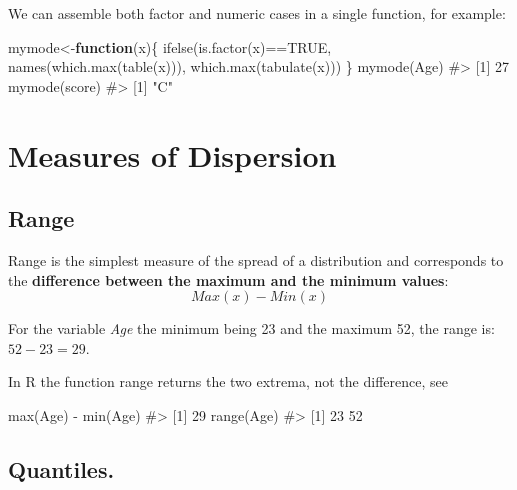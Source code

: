 \documentclass[
  letterpaper,
  DIV=11,
  numbers=noendperiod]{scrreprt}
\newenvironment{Shaded}{\begin{snugshade}}{\end{snugshade}}
\newcommand{\CommentTok}[1]{\textcolor[rgb]{0.37,0.37,0.37}{#1}}
\newcommand{\ConstantTok}[1]{\textcolor[rgb]{0.56,0.35,0.01}{#1}}
\newcommand{\ControlFlowTok}[1]{\textcolor[rgb]{0.00,0.23,0.31}{\textbf{#1}}}
\newcommand{\FunctionTok}[1]{\textcolor[rgb]{0.28,0.35,0.67}{#1}}
\newcommand{\NormalTok}[1]{\textcolor[rgb]{0.00,0.23,0.31}{#1}}
\newcommand{\OtherTok}[1]{\textcolor[rgb]{0.00,0.23,0.31}{#1}}
\newcommand{\SpecialCharTok}[1]{\textcolor[rgb]{0.37,0.37,0.37}{#1}}
\begin{document}
We can assemble both factor and numeric cases in a single function, for
example:

\begin{Shaded}
\begin{Highlighting}[]
\NormalTok{mymode}\OtherTok{\textless{}{-}}\ControlFlowTok{function}\NormalTok{(x)\{}
  \FunctionTok{ifelse}\NormalTok{(}\FunctionTok{is.factor}\NormalTok{(x)}\SpecialCharTok{==}\ConstantTok{TRUE}\NormalTok{,}
         \FunctionTok{names}\NormalTok{(}\FunctionTok{which.max}\NormalTok{(}\FunctionTok{table}\NormalTok{(x))),}
         \FunctionTok{which.max}\NormalTok{(}\FunctionTok{tabulate}\NormalTok{(x)))}
\NormalTok{\}}
\FunctionTok{mymode}\NormalTok{(Age)}
\CommentTok{\#\textgreater{} [1] 27}
\FunctionTok{mymode}\NormalTok{(score)}
\CommentTok{\#\textgreater{} [1] "C"}
\end{Highlighting}
\end{Shaded}

\section{Measures of Dispersion}\label{measures-of-dispersion}

\subsection{Range}\label{range}

Range is the simplest measure of the spread of a distribution and
corresponds to the \textbf{difference between the maximum and the
minimum values}: \[Max(x) - Min(x)\]

For the variable \emph{Age} the minimum being 23 and the maximum 52, the
range is: \(52 - 23 = 29\).

In R the function range returns the two extrema, not the difference, see

\begin{Shaded}
\begin{Highlighting}[]
\FunctionTok{max}\NormalTok{(Age) }\SpecialCharTok{{-}} \FunctionTok{min}\NormalTok{(Age)}
\CommentTok{\#\textgreater{} [1] 29}
\FunctionTok{range}\NormalTok{(Age)}
\CommentTok{\#\textgreater{} [1] 23 52}
\end{Highlighting}
\end{Shaded}

\subsection{Quantiles.}\label{quantiles.}
\end{document}

